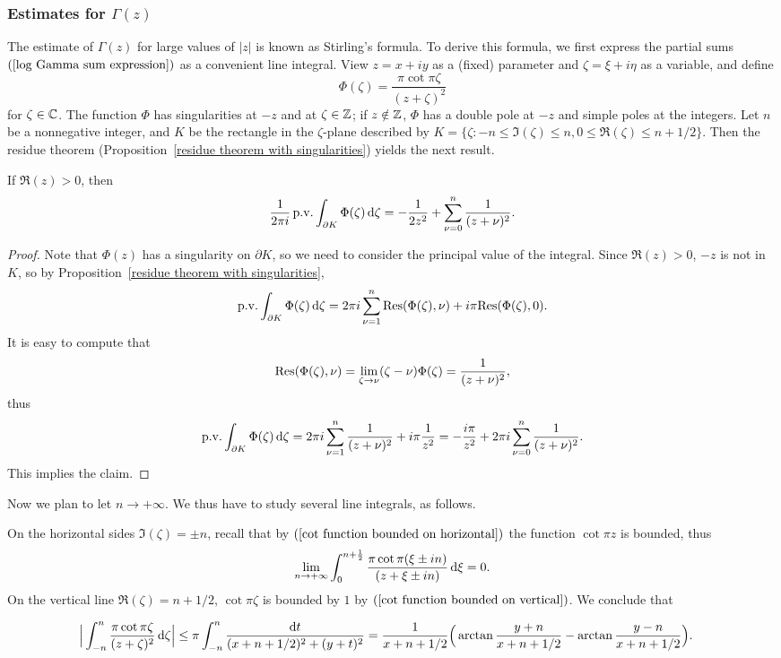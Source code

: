 \subsubsection{Estimates for $\Gamma(z)$}
The estimate of $\Gamma(z)$ for large values of $|z|$ is known as Stirling's formula. To derive this formula, we first express the partial sums $(\ref{log Gamma sum expression})$ as a convenient line integral. View $z=x+iy$ as a (fixed) parameter and $\zeta=\xi+i\eta$ as a variable, and define
\[\Phi(\zeta)=\frac{\pi\cot\pi\zeta}{(z+\zeta)^2}\]
for $\zeta\in\mathbb{C}$. The function $\Phi$ has singularities at $-z$ and at $\zeta\in\mathbb{Z}$; if $z\notin\mathbb{Z}$, $\Phi$ has a double pole at $-z$ and simple poles at the integers. Let $n$ be a nonnegative integer, and $K$ be the rectangle in the $\zeta$-plane described by $K=\{\zeta:-n\leq\Im(\zeta)\leq n,0\leq\Re(\zeta)\leq n+1/2\}$. Then the residue theorem (Proposition~\ref{residue theorem with singularities}) yields the next result.
\begin{proposition}
If $\Re(z)>0$, then
\[\frac{1}{2\pi i}\,\mathrm{ p.v.}\int_{\partial K}\Phi(\zeta)\mathop{}\!\mathrm{d}\zeta=-\frac{1}{2z^2}+\sum_{\nu=0}^{n}\frac{1}{(z+\nu)^2}.\]
\end{proposition}
\begin{proof}
Note that $\Phi(z)$ has a singularity on $\partial K$, so we need to consider the principal value of the integral. Since $\Re(z)>0$, $-z$ is not in $K$, so by Proposition~\ref{residue theorem with singularities},
\[\mathrm{ p.v.}\int_{\partial K}\Phi(\zeta)\mathop{}\!\mathrm{d}\zeta=2\pi i\sum_{\nu=1}^{n}\mathrm{Res}(\Phi(\zeta),\nu)+i\pi\mathrm{Res}(\Phi(\zeta),0).\]
It is easy to compute that
\[\mathrm{Res}(\Phi(\zeta),\nu)=\lim_{\zeta\to\nu}(\zeta-\nu)\Phi(\zeta)=\frac{1}{(z+\nu)^2},\]
thus
\[\mathrm{ p.v.}\int_{\partial K}\Phi(\zeta)\mathop{}\!\mathrm{d}\zeta=2\pi i\sum_{\nu=1}^{n}\frac{1}{(z+\nu)^2}+i\pi\frac{1}{z^2}=-\frac{i\pi}{z^2}+2\pi i\sum_{\nu=0}^{n}\frac{1}{(z+\nu)^2}.\]
This implies the claim.
\end{proof}
Now we plan to let $n\to+\infty$. We thus have to study several line integrals, as follows.\par
On the horizontal sides $\Im(\zeta)=\pm n$, recall that by $(\ref{cot function bounded on horizontal})$ the function $\cot\pi z$ is bounded, thus
\[\lim_{n\to+\infty}\int_{0}^{n+\frac{1}{2}}\frac{\pi\cot\pi(\xi\pm in)}{(z+\xi\pm in)}\mathop{}\!\mathrm{d}\xi=0.\]
On the vertical line $\Re(\zeta)=n+1/2$, $\cot\pi\zeta$ is bounded by $1$ by $(\ref{cot function bounded on vertical})$. We conclude that 
\begin{small}
\begin{align*}
\Big|\int_{-n}^{n}\frac{\pi\cot\pi\zeta}{(z+\zeta)^2}\mathop{}\!\mathrm{d}\zeta\Big|&\leq\pi\int_{-n}^{n}\frac{\mathop{}\!\mathrm{d} t}{(x+n+1/2)^2+(y+t)^2}=\frac{1}{x+n+1/2}\Big(\arctan\frac{y+n}{x+n+1/2}-\arctan\frac{y-n}{x+n+1/2}\Big).
\end{align*}
\end{small}

